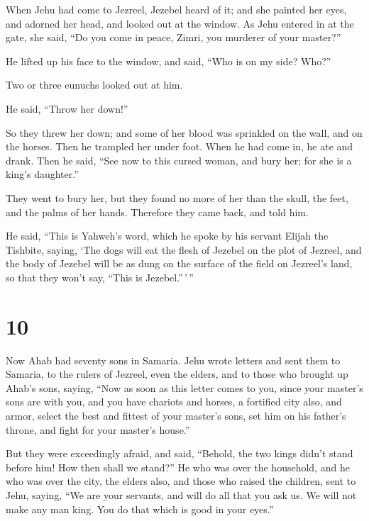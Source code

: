  When Jehu had come to Jezreel, Jezebel heard of it; and
she painted her eyes, and adorned her head, and looked out at the
window.  As Jehu entered in at the gate, she said, ``Do
you come in peace, Zimri, you murderer of your master?''

 He lifted up his face to the window, and said, ``Who is
on my side? Who?''

Two or three eunuchs looked out at him.

 He said, ``Throw her down!''

So they threw her down; and some of her blood was sprinkled on the wall,
and on the horses. Then he trampled her under foot.  When
he had come in, he ate and drank. Then he said, ``See now to this cursed
woman, and bury her; for she is a king's daughter.''

 They went to bury her, but they found no more of her
than the skull, the feet, and the palms of her hands. 
Therefore they came back, and told him.

He said, ``This is Yahweh's word, which he spoke by his servant Elijah
the Tishbite, saying, `The dogs will eat the flesh of Jezebel on the
plot of Jezreel,  and the body of Jezebel will be as dung
on the surface of the field on Jezreel's land, so that they won't say,
``This is Jezebel.''\,'\,''

\hypertarget{section-9}{%
\section{10}\label{section-9}}

 Now Ahab had seventy sons in Samaria. Jehu wrote letters
and sent them to Samaria, to the rulers of Jezreel, even the elders, and
to those who brought up Ahab's sons, saying,  ``Now as
soon as this letter comes to you, since your master's sons are with you,
and you have chariots and horses, a fortified city also, and armor,
 select the best and fittest of your master's sons, set
him on his father's throne, and fight for your master's house.''

 But they were exceedingly afraid, and said, ``Behold, the
two kings didn't stand before him! How then shall we stand?''
 He who was over the household, and he who was over the
city, the elders also, and those who raised the children, sent to Jehu,
saying, ``We are your servants, and will do all that you ask us. We will
not make any man king. You do that which is good in your eyes.''

